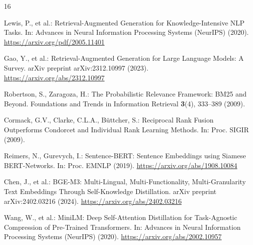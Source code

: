 \documentclass[runningheads]{llncs}
\begin{document}

\begin{thebibliography}{16}

Lewis, P., et al.: Retrieval-Augmented Generation for Knowledge-Intensive NLP Tasks. In: Advances in Neural Information Processing Systems (NeurIPS) (2020). \url{https://arxiv.org/pdf/2005.11401}

Gao, Y., et al.: Retrieval-Augmented Generation for Large Language Models: A Survey. arXiv preprint arXiv:2312.10997 (2023). \url{https://arxiv.org/abs/2312.10997}

Robertson, S., Zaragoza, H.: The Probabilistic Relevance Framework: BM25 and Beyond. Foundations and Trends in Information Retrieval \textbf{3}(4), 333--389 (2009). 

Cormack, G.V., Clarke, C.L.A., B\"{u}ttcher, S.: Reciprocal Rank Fusion Outperforms Condorcet and Individual Rank Learning Methods. In: Proc. SIGIR (2009). 

Reimers, N., Gurevych, I.: Sentence-BERT: Sentence Embeddings using Siamese BERT-Networks. In: Proc. EMNLP (2019). \url{https://arxiv.org/abs/1908.10084}

Chen, J., et al.: BGE-M3: Multi-Lingual, Multi-Functionality, Multi-Granularity Text Embeddings Through Self-Knowledge Distillation. arXiv preprint arXiv:2402.03216 (2024). \url{https://arxiv.org/abs/2402.03216}

Wang, W., et al.: MiniLM: Deep Self-Attention Distillation for Task-Agnostic Compression of Pre-Trained Transformers. In: Advances in Neural Information Processing Systems (NeurIPS) (2020). \url{https://arxiv.org/abs/2002.10957}


\end{thebibliography}
\end{document}
